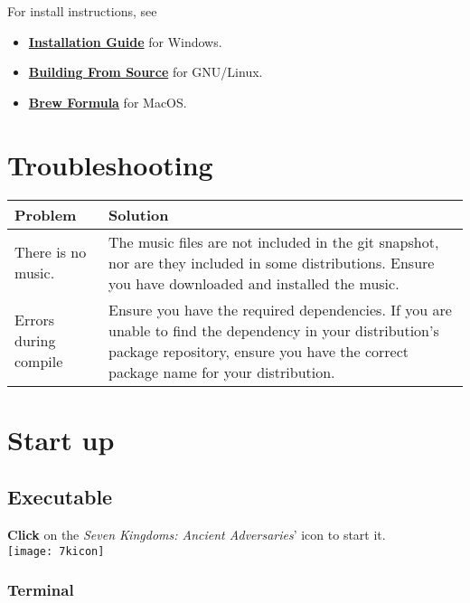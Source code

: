 For install instructions, see

\begin{itemize}
\item \href{https://www.7kfans.com/wiki/index.php/Installation\_Guide}{\textbf{Installation Guide}} for Windows.

\item \href{https://www.7kfans.com/wiki/index.php/Building\_From_Source}{\textbf{Building From Source}} for GNU/Linux.

\item \href{https://www.7kfans.com/wiki/index.php/Brew\_Formula}{\textbf{Brew Formula}} for MacOS.
\end{itemize}

\section{Troubleshooting}

\begin{tabular}{ | l | p{6cm} |}
	\hline
Problem	& Solution \\ \hline
There is no music. & The music files are not included in the git snapshot, nor are they included in some distributions. Ensure you have downloaded and installed the music. \\ \hline
Errors during compile & Ensure you have the required dependencies. If you are unable to find the dependency in your distribution's package repository, ensure you have the correct package name for your distribution. \\
 \hline
\end{tabular}

\section{Start up}

\subsection{Executable}

\textbf{Click} on the \textit{Seven Kingdoms: Ancient Adversaries}' icon  to start it. \\

\texttt{[image: 7kicon]}

\subsubsection{Terminal}

